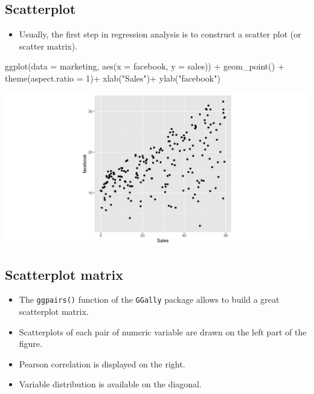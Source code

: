 \documentclass[
]{book}
\newenvironment{Shaded}{\begin{snugshade}}{\end{snugshade}}
\newcommand{\AttributeTok}[1]{\textcolor[rgb]{0.77,0.63,0.00}{#1}}
\newcommand{\DecValTok}[1]{\textcolor[rgb]{0.00,0.00,0.81}{#1}}
\newcommand{\FunctionTok}[1]{\textcolor[rgb]{0.00,0.00,0.00}{#1}}
\newcommand{\NormalTok}[1]{#1}
\newcommand{\SpecialCharTok}[1]{\textcolor[rgb]{0.00,0.00,0.00}{#1}}
\newcommand{\StringTok}[1]{\textcolor[rgb]{0.31,0.60,0.02}{#1}}
\providecommand{\tightlist}{%
  \setlength{\itemsep}{0pt}\setlength{\parskip}{0pt}}
\begin{document}
\hypertarget{scatterplot}{%
\subsection{Scatterplot}\label{scatterplot}}

\begin{itemize}
\tightlist
\item
  Usually, the first step in regression analysis is to construct a scatter plot (or scatter matrix).
\end{itemize}

\begin{Shaded}
\begin{Highlighting}[]
\FunctionTok{ggplot}\NormalTok{(}\AttributeTok{data =}\NormalTok{ marketing, }\FunctionTok{aes}\NormalTok{(}\AttributeTok{x =}\NormalTok{ facebook, }\AttributeTok{y =}\NormalTok{ sales)) }\SpecialCharTok{+}
  \FunctionTok{geom\_point}\NormalTok{() }\SpecialCharTok{+}
  \FunctionTok{theme}\NormalTok{(}\AttributeTok{aspect.ratio =} \DecValTok{1}\NormalTok{)}\SpecialCharTok{+}
  \FunctionTok{xlab}\NormalTok{(}\StringTok{"Sales"}\NormalTok{)}\SpecialCharTok{+}
  \FunctionTok{ylab}\NormalTok{(}\StringTok{"facebook"}\NormalTok{)}
\end{Highlighting}
\end{Shaded}

\begin{center}\includegraphics{figure/unnamed-chunk-26-1} \end{center}

\hypertarget{scatterplot-matrix}{%
\subsection{Scatterplot matrix}\label{scatterplot-matrix}}

\begin{itemize}
\tightlist
\item
  The \texttt{ggpairs()} function of the \texttt{GGally} package allows to build a great scatterplot matrix.
\item
  Scatterplots of each pair of numeric variable are drawn on the left part of the figure.
\item
  Pearson correlation is displayed on the right.
\item
  Variable distribution is available on the diagonal.
\end{itemize}
\end{document}
